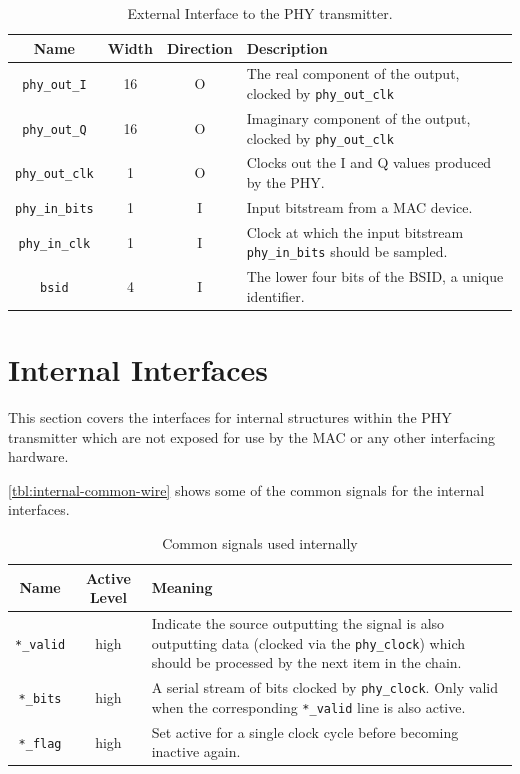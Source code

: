 \documentclass[dvips,10pt,twocolumn]{article}
\begin{document}
\begin{table} \begin{tabularx}{\textwidth}{c|c|c|X}
	\label{tbl:extern-io}
	Name & Width & Direction & Description\\ \hline

	\texttt{phy\_out\_I} & 16 & O & The real component of the output,
	clocked by \texttt{phy\_out\_clk} \\

	\texttt{phy\_out\_Q} & 16 & O & Imaginary component of the output,
	clocked by \texttt{phy\_out\_clk} \\

	\texttt{phy\_out\_clk} & 1 & O & Clocks out the I and Q values
	produced by the PHY. \\

	\texttt{phy\_in\_bits} & 1 & I & Input bitstream from a MAC
	device. \\

	\texttt{phy\_in\_clk} & 1 & I & Clock at which the input bitstream
	\texttt{phy\_in\_bits} should be sampled. \\

	\texttt{bsid} & 4 & I & The lower four bits of the BSID, a unique
	identifier.
\end{tabularx}
\caption{External Interface to the PHY transmitter.}
\end{table}

\section{Internal Interfaces}
This section covers the interfaces for internal structures within the PHY
transmitter which are not exposed for use by the MAC or any other interfacing
hardware.

\autoref{tbl:internal-common-wire} shows some of the common signals for
the internal interfaces.

\begin{table}
\begin{tabulary}{\textwidth}{c|C|L}
	\label{tbl:internal-common-wire}
	Name & Active Level & Meaning \\ \hline
	
	\texttt{*\_valid} & high & Indicate the source outputting the signal
	is also outputting data (clocked via the \texttt{phy\_clock}) which
	should be processed by the next item in the chain. \\

	\texttt{*\_bits} & high & A serial stream of bits clocked by
	\texttt{phy\_clock}. Only valid when the corresponding
	\texttt{*\_valid} line is also active. \\

	\texttt{*\_flag} & high & Set active for a single clock cycle
	before becoming inactive again.
\end{tabulary}
\caption{Common signals used internally}
\end{table}
\end{document}
